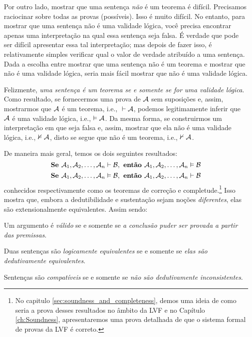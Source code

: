 Por outro lado, mostrar que uma sentença \emph{não} é um teorema é difícil. Precisamos raciocinar sobre todas as provas (possíveis). Isso é muito difícil. No entanto, para mostrar que uma sentença não é uma validade lógica, você precisa encontrar apenas uma interpretação na qual essa sentença seja falsa. É verdade que pode ser difícil apresentar essa tal interpretação; mas depois de fazer isso, é relativamente simples verificar qual o valor de verdade atribuído a uma sentença. Dada a escolha entre mostrar que uma sentença não é um teorema e mostrar que não é uma validade lógica, seria mais fácil mostrar que não é uma validade lógica.

Felizmente, \emph{uma sentença é um teorema se e somente se for uma validade lógica}. Como resultado, se fornecermos uma prova de $\mathcal{A}$ sem suposições e, assim, mostrarmos que $\mathcal{A}$ é um teorema, i.e., ${}\vdash \mathcal{A}$, podemos legitimamente inferir que $\mathcal{A}$ é uma validade lógica, i.e., $\vDash\mathcal{A}$. Da mesma forma, se construirmos um interpretação em que  seja falsa e, assim, mostrar que ela não é uma validade lógica, i.e., $\nvDash \mathcal{A}$, disto se segue que  não é um teorema, i.e.,  $\nvdash \mathcal{A}$.

De maneira mais geral, temos os dois seguintes resultados: 
$$\textbf{Se }\mathcal{A}_1, \mathcal{A}_2, \ldots, \mathcal{A}_n \vdash\mathcal{B}, \textbf{ então }\mathcal{A}_1, \mathcal{A}_2, \ldots, \mathcal{A}_n \vDash\mathcal{B}$$
$$\textbf{Se }\mathcal{A}_1, \mathcal{A}_2, \ldots, \mathcal{A}_n \vDash\mathcal{B}, \textbf{ então }\mathcal{A}_1, \mathcal{A}_2, \ldots, \mathcal{A}_n \vdash\mathcal{B} $$
conhecidos respectivamente como os teoremas de correção e completude.\footnote{No capitulo \ref{sec:soundness_and_completeness},  demos uma ideia de como seria a prova desses resultados  no âmbito da LVF  e no Capítulo  \ref{ch:Soundness}, apresentaremos uma prova detalhada de que o sistema formal de provas da LVF é correto.}  Isso mostra que, embora a dedutibilidade e sustentação sejam noções \emph{diferentes}, elas são extensionalmente equivalentes. Assim sendo:
	\begin{ebullet}
		\item Um argumento é \emph{válido} se e somente se \emph{a conclusão puder ser provada a partir das premissas}.
		\item Duas sentenças são \emph{logicamente equivalentes} se e somente se \emph{elas são dedutivamente equivalentes}.
		\item Sentenças são \emph{compatíveis} se e somente se  \emph{não são dedutivamente inconsistentes}.
	\end{ebullet}
 

